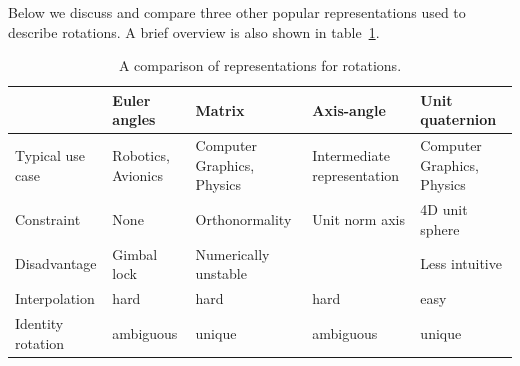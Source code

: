 		Below we discuss and compare three other popular representations used to describe rotations.
		A brief overview is also shown in table~\ref{tbl:comparison_representations_of_rotations}.
		\begin{table}
			\small
			\begin{center}
				\begin{tabular}{|l|p{2.5cm}|p{2.5cm}|p{2.5cm}|p{2.5cm}|}
					\hline
					& Euler angles & Matrix & Axis-angle & Unit quaternion \\ \hline
					Typical use case & Robotics, Avionics & Computer Graphics, Physics & Intermediate representation & Computer Graphics, Physics \\ \hline
					Constraint & None & Orthonormality & Unit norm axis & 4D unit sphere \\ \hline
					Disadvantage & Gimbal lock & Numerically unstable & & Less intuitive \\ \hline
					Interpolation & hard & hard & hard & easy \\ \hline
					Identity rotation & ambiguous & unique & ambiguous &unique \\ 
					\hline
				\end{tabular}
			\end{center}
			\caption[A comparison of representations for rotations]
					{A comparison of representations for rotations.}
			\label{tbl:comparison_representations_of_rotations}
		\end{table}
		

